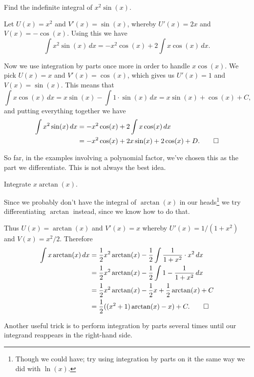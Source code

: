 \begin{example}
	Find the indefinite integral of $x^2 \sin(x)$.

	Let $U(x) = x^2$ and $V'(x) = \sin(x)$, whereby $U'(x) = 2 x$ and $V(x) = - \cos(x)$.
	Using this we have
	\[
		\int x^2 \sin(x) \, d x = - x^2 \cos(x)  + 2 \int x \cos(x) \, d x.
	\]

	\noindent
	Now we use integration by parts once more in order to handle $x \cos(x)$.
	We pick $U(x) = x$ and $V'(x) = \cos(x)$, which gives us $U'(x) = 1$ and $V(x) = \sin(x)$.
	This means that
	\[
		\int x \cos(x) \, d x = x \sin(x) - \int 1 \cdot \sin(x) \, d x = x \sin(x) + \cos(x) + C,
	\]
	and putting everything together we have
	\begin{align*}
		\int x^2 \sin(x) \, d x &= - x^2 \cos(x)  + 2 \int x \cos(x) \, d x \\
		                        &= - x^2 \cos(x) + 2 x \sin(x) + 2 \cos(x) + D. \qedhere
	\end{align*}
\end{example}

\noindent
So far, in the examples involving a polynomial factor, we've chosen this as the part we differentiate.
This is not always the best idea.

\begin{example}
	Integrate $x \arctan(x)$.

	Since we probably don't have the integral of $\arctan(x)$ in our heads\footnote{Though we could have; try using integration by parts on it the same way we did with $\ln(x)$.} we try differentiating $\arctan$ instead, since we know how to do that.

	Thus $U(x) = \arctan(x)$ and $V'(x) = x$ whereby $U'(x) = 1 / (1 + x^2)$ and $V(x) = x^2 / 2$.
	Therefore
	\begin{align*}
		\int x \arctan(x) \, d x &= \frac{1}{2} x^2 \arctan(x) - \frac{1}{2} \int \frac{1}{1 + x^2} \cdot x^2 \, d x \\
		                         &= \frac{1}{2} x^2 \arctan(x) - \frac{1}{2} \int 1 - \frac{1}{1 + x^2} \, d x \\
		                         &= \frac{1}{2} x^2 \arctan(x) - \frac{1}{2} x + \frac{1}{2} \arctan(x) + C \\
														 &= \frac{1}{2} ((x^2 + 1) \arctan(x) - x) + C. \qedhere
	\end{align*}
\end{example}

\noindent
Another useful trick is to perform integration by parts several times until our integrand reappears in the right-hand side.

